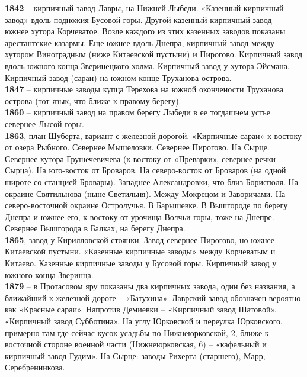 \noindent\textbf{1842} – кирпичный завод Лавры, на Нижней Лыбеди. «Казенный кирпичный завод» вдоль подножия Бусовой горы. Другой казенный кирпичный завод – южнее хутора Корчеватое. Возле каждого из этих казенных заводов показаны арестантские казармы. Еще южнее вдоль Днепра, кирпичный завод между хутором Виноградным (ниже Китаевской пустыни) и Пирогово. Кирпичный завод вдоль южного конца Зверинецкого холма. Кирпичный завод у хутора Эйсмана. Кирпичный завод (сараи) на южном конце Труханова острова.\\

\noindent\textbf{1847} – кирпичные заводы купца Терехова на южной окончености Труханова острова (тот язык, что ближе к правому берегу).\\

\noindent\textbf{1860} – кирпичный завод на правом берегу Лыбеди в ее тогдашнем устье севернее Лысой горы.\\

\noindent\textbf{1863}, план Шуберта, вариант с железной дорогой. «Кирпичные сараи» к востоку от озера Рыбного. Севернее Мышеловки. Севернее Пирогово. На Сырце. Севернее хутора Грушечевичева (к востоку от «Преварки», севернее речки Сырца). На юго-восток от Броваров. На северо-восток от Броваров (на одной широте со станцией Бровары). Западнее Александровки, что близ Борисполя. На окраине Святильнова (ныне Светильня). Между Мокрецом и Заворичами. На северо-восточной окраине Остролучья. В Барышевке. В Вышгороде по берегу Днепра и южнее его, к востоку от урочища Волчьи горы, тоже на Днепре. Севернее Вышгорода в Балках, на берегу Днепра.\\

\noindent\textbf{1865}, завод у Кирилловской стоянки. Завод севернее Пирогово, но южнее Китаевской пустыни. «Казенные кирпичные заводы» между Корчеватым и Китаево. Казенные кирпичные заводы у Бусовой горы. Кирпичный завод у южного конца Зверинца.\\

\noindent\textbf{1879} – в Протасовом яру показаны два кирпичных завода, один без названия, а ближайший к железной дороге – «Батухина». Лаврский завод обозначен вероятно как «Красные сараи». Напротив Демиевки – «Кирпичный завод Шатовой», «Кирпичный завод Субботина». На углу Юрковской и переулка Юрковского, примерно там где сейчас кусок усадьбы по Нижнеюрковской, 2, ближе к восточной стороне военной части (Нижнеюрковская, 6) – «кафельный и кирпичный завод Гудим». На Сырце: заводы Рихерта (старшего), Марр, Серебренникова.\\

